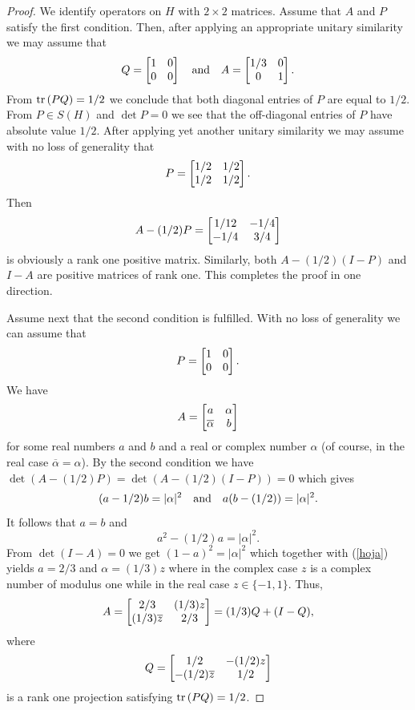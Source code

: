 \documentclass{article}
\begin{document}
\begin{proof}
We identify operators on $H$ with $2\times 2$ matrices. Assume that $A$ and $P$ satisfy the first condition. Then, after applying an appropriate unitary similarity we may assume that
$$
Q= \left[ \begin{matrix} 1& 0 \cr 0 & 0 \cr \end{matrix} \right] \ \ \ {\rm and} \ \ \ A = \left[ \begin{matrix} 1/3 & 0 \cr 0 & 1 \cr \end{matrix} \right] .
$$
From ${\rm tr}\, (PQ) = 1/2$ we conclude that both diagonal entries of $P$ are equal to $1/2$. From $P\in S(H)$ and $\det P =0$ we see that the off-diagonal entries of $P$ have absolute value $1/2$. After applying yet another unitary similarity we may assume with no loss of generality that
$$
P= \left[ \begin{matrix} 1/2& 1/2 \cr 1/2 & 1/2 \cr \end{matrix} \right] .
$$
Then
$$
A - (1/2)P = \left[ \begin{matrix} 1/12& -1/4 \cr -1/4 & 3/4 \cr \end{matrix} \right]
$$
is obviously a rank one positive matrix. Similarly, both $A - (1/2) (I-P)$ and $I-A$ are positive matrices of rank one. This completes the proof in one direction.

Assume next that the second condition is fulfilled. With no loss of generality we can assume that 
$$
P= \left[ \begin{matrix} 1& 0 \cr 0 & 0 \cr \end{matrix} \right] .
$$
We have
$$
A = \left[ \begin{matrix} a& \alpha \cr \overline{\alpha} & b \cr \end{matrix} \right]
$$
for some real numbers $a$ and $b$ and a real or complex number $\alpha$ (of course, in the real case $\overline{\alpha} = \alpha$). By the second condition we have $\det (A - (1/2)P) = \det (A - (1/2) (I-P))=0$ which gives
$$
(a - 1/2) b = |\alpha |^2 \ \ \ {\rm and} \ \ \ a (b- (1/2)) =  |\alpha |^2 .
$$ 
It follows that $a=b$ and 
\begin{equation}\label{hoja}
a^2 -(1/2)a = |\alpha |^2 .
\end{equation} 
From $\det (I-A) = 0$ we get $(1-a)^2 = |\alpha |^2$ which together with (\ref{hoja}) yields $a=2/3$ and $\alpha = (1/3)z$ where in the complex case $z$ is a complex number of modulus one while in the real case $z \in \{ -1 , 1 \}$. Thus,
$$
A = \left[ \begin{matrix} 2/3 & (1/3) z \cr (1/3)\overline{z} & 2/3 \cr \end{matrix} \right] = (1/3)Q + (I-Q),
$$
where 
$$
Q =  \left[ \begin{matrix} 1/2 & -(1/2) z \cr - (1/2)\overline{z} & 1/2 \cr \end{matrix} \right]
$$
is a rank one projection satisfying ${\rm tr}\, (PQ) = 1/2$.
\end{proof}
\end{document}
